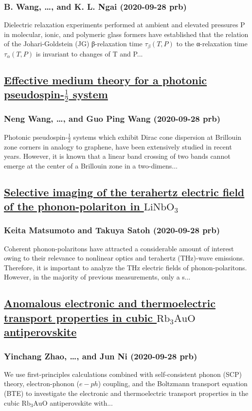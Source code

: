 \subsubsection*{B. Wang, \dots, and K. L. Ngai (2020-09-28 prb)}
Dielectric relaxation experiments performed at ambient and elevated pressures P in molecular, ionic, and polymeric glass formers have established that the relation of the Johari-Goldstein (JG) β-relaxation time ${τ}_{β}(T,P)$ to the α-relaxation time ${τ}_{α}(T,P)$ is invariant to changes of T and P...
\subsection*{\href{http://link.aps.org/doi/10.1103/PhysRevB.102.094312}{Effective medium theory for a photonic pseudospin-$\frac{1}{2}$ system}}
\subsubsection*{Neng Wang, \dots, and Guo Ping Wang (2020-09-28 prb)}
Photonic pseudospin-$\frac{1}{2}$ systems which exhibit Dirac cone dispersion at Brillouin zone corners in analogy to graphene, have been extensively studied in recent years. However, it is known that a linear band crossing of two bands cannot emerge at the center of a Brillouin zone in a two-dimens...
\subsection*{\href{http://link.aps.org/doi/10.1103/PhysRevB.102.094313}{Selective imaging of the terahertz electric field of the phonon-polariton in ${\mathrm{LiNbO}}_{3}$}}
\subsubsection*{Keita Matsumoto and Takuya Satoh (2020-09-28 prb)}
Coherent phonon-polaritons have attracted a considerable amount of interest owing to their relevance to nonlinear optics and terahertz (THz)-wave emissions. Therefore, it is important to analyze the THz electric fields of phonon-polaritons. However, in the majority of previous measurements, only a s...
\subsection*{\href{http://link.aps.org/doi/10.1103/PhysRevB.102.094314}{Anomalous electronic and thermoelectric transport properties in cubic ${\mathrm{Rb}}_{3}\mathrm{AuO}$ antiperovskite}}
\subsubsection*{Yinchang Zhao, \dots, and Jun Ni (2020-09-28 prb)}
We use first-principles calculations combined with self-consistent phonon (SCP) theory, electron-phonon ($e−ph$) coupling, and the Boltzmann transport equation (BTE) to investigate the electronic and thermoelectric transport properties in the cubic ${\mathrm{Rb}}_{3}\mathrm{AuO}$ antiperovskite with...
